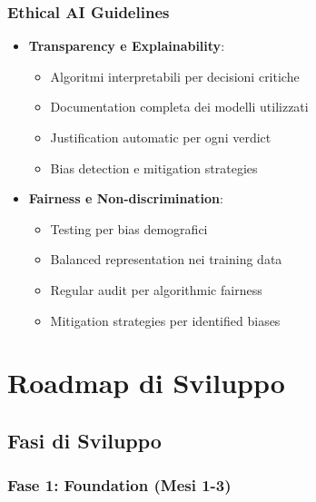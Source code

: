\documentclass[12pt,a4paper]{report}
\begin{document}
\subsubsection{Ethical AI Guidelines}

\begin{itemize}
    \item \textbf{Transparency e Explainability}:
    \begin{itemize}
        \item Algoritmi interpretabili per decisioni critiche
        \item Documentation completa dei modelli utilizzati
        \item Justification automatic per ogni verdict
        \item Bias detection e mitigation strategies
    \end{itemize}
    
    \item \textbf{Fairness e Non-discrimination}:
    \begin{itemize}
        \item Testing per bias demografici
        \item Balanced representation nei training data
        \item Regular audit per algorithmic fairness
        \item Mitigation strategies per identified biases
    \end{itemize}
\end{itemize}

\section{Roadmap di Sviluppo}

\subsection{Fasi di Sviluppo}

\subsubsection{Fase 1: Foundation (Mesi 1-3)}
\end{document}
